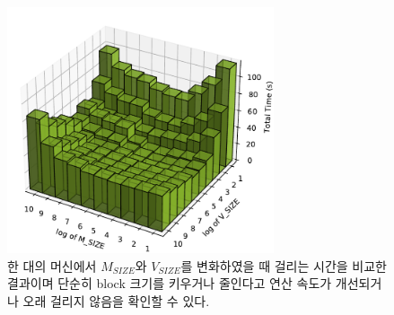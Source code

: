 \documentclass{article}
\begin{document}
\begin{figure}[ht]
	\centering
	\includegraphics[width=0.7\textwidth]{fig3.pdf}
	\caption{한 대의 머신에서 $M_{SIZE}$와 $V_{SIZE}$를 변화하였을 때 걸리는 시간을 비교한 결과이며 단순히 block 크기를 키우거나 줄인다고 연산 속도가 개선되거나 오래 걸리지 않음을 확인할 수 있다.}
\label{fig3}
\end{figure}
\end{document}
